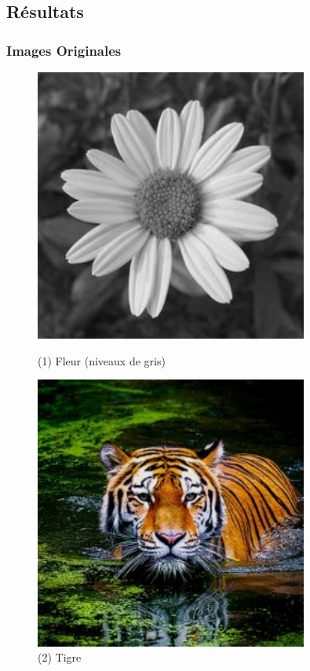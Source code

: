 \subsection{Résultats}

\subsubsection{Images Originales}

\begin{figure}[h!]
    \centering
    \begin{minipage}[b]{0.45\textwidth}
        \centering
        \includegraphics[width=0.8\textwidth]{images/originals/flower.jpg}
        \caption*{(1) Fleur (niveaux de gris)}
    \end{minipage}
    \begin{minipage}[b]{0.45\textwidth}
        \centering
        \includegraphics[width=0.8\textwidth]{images/originals/tiger.jpeg}
        \caption*{(2) Tigre}
    \end{minipage}
\end{figure}

